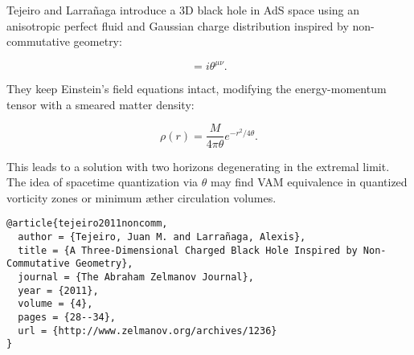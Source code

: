 Tejeiro and Larrañaga \cite{tejeiro2011noncomm} introduce a 3D black hole in AdS space using an anisotropic perfect fluid and Gaussian charge distribution inspired by non-commutative geometry:

\begin{equation}
[x^\mu, x^\nu] = i \theta^{\mu\nu}.
\end{equation}

They keep Einstein’s field equations intact, modifying the energy-momentum tensor with a smeared matter density:

\begin{equation}
\rho(r) = \frac{M}{4\pi \theta} e^{-r^2/4\theta}.
\end{equation}

This leads to a solution with two horizons degenerating in the extremal limit. The idea of spacetime quantization via $\theta$ may find VAM equivalence in quantized vorticity zones or minimum æther circulation volumes.

\begin{verbatim}
@article{tejeiro2011noncomm,
  author = {Tejeiro, Juan M. and Larrañaga, Alexis},
  title = {A Three-Dimensional Charged Black Hole Inspired by Non-Commutative Geometry},
  journal = {The Abraham Zelmanov Journal},
  year = {2011},
  volume = {4},
  pages = {28--34},
  url = {http://www.zelmanov.org/archives/1236}
}
\end{verbatim}
